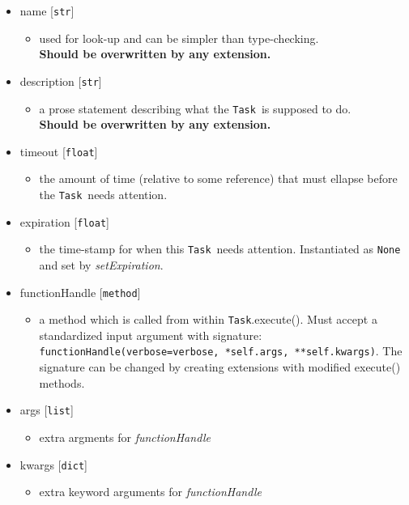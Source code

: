 \documentclass{article}
\newcommand{\Task}{\texttt{Task}}
\newcommand{\pythonfloat}{\texttt{float}}
\newcommand{\pythonstr}{\texttt{str}}
\newcommand{\pythonlist}{\texttt{list}}
\newcommand{\pythondict}{\texttt{dict}}
\begin{document}
\begin{itemize}
    \item{name [\pythonstr]
        \begin{itemize}
            \item{used for look-up and can be simpler than type-checking. \\ \textbf{Should be overwritten by any extension.}}
        \end{itemize}
         }
    \item{description [\pythonstr]
        \begin{itemize}
            \item{a prose statement describing what the \Task~is supposed to do. \\ \textbf{Should be overwritten by any extension.}}
        \end{itemize}
         }
    \item{timeout [\pythonfloat]
        \begin{itemize}
            \item{the amount of time (relative to some reference) that must ellapse before the \Task~needs attention.}
        \end{itemize}
         }
    \item{expiration [\pythonfloat]
        \begin{itemize}
            \item{the time-stamp for when this \Task~needs attention. Instantiated as \texttt{None} and set by \textit{setExpiration}.}
        \end{itemize}
         }
    \item{functionHandle [\texttt{method}]
        \begin{itemize}
            \item{a method which is called from within \Task.execute(). Must accept a standardized input argument with signature: \texttt{functionHandle(verbose=verbose, *self.args, **self.kwargs)}. The signature can be changed by creating extensions with modified execute() methods.}
        \end{itemize}
         }
    \item{args [\pythonlist]
        \begin{itemize}
            \item{extra argments for \textit{functionHandle}}
        \end{itemize}
         }
    \item{kwargs [\pythondict]
        \begin{itemize}
            \item{extra keyword arguments for \textit{functionHandle}}
        \end{itemize}
         }
\end{itemize}
\end{document}
